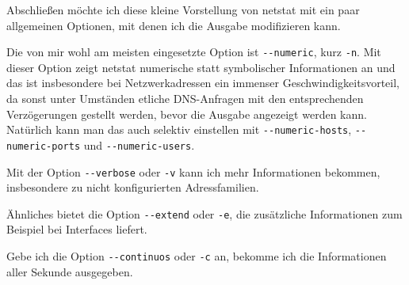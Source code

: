 \begin{normaltext}
  Abschließen möchte ich diese kleine Vorstellung von netstat mit ein paar
  allgemeinen Optionen, mit denen ich die Ausgabe modifizieren kann.

  Die von mir wohl am meisten eingesetzte Option ist \verb?--numeric?, kurz
  \verb?-n?. Mit dieser Option zeigt netstat numerische statt symbolischer
  Informationen an und das ist insbesondere bei Netzwerkadressen ein immenser
  Geschwindigkeitsvorteil, da sonst unter Umständen etliche DNS-Anfragen mit
  den entsprechenden Verzögerungen gestellt werden, bevor die Ausgabe
  angezeigt werden kann. Natürlich kann man das auch selektiv einstellen mit
  \verb?--numeric-hosts?, \verb?--numeric-ports? und \verb?--numeric-users?.

  Mit der Option \verb?--verbose? oder \verb?-v? kann ich mehr Informationen
  bekommen, insbesondere zu nicht konfigurierten Adressfamilien.

  Ähnliches bietet die Option \verb?--extend? oder \verb?-e?, die zusätzliche
  Informationen zum Beispiel bei Interfaces liefert.

  Gebe ich die Option \verb?--continuos? oder \verb?-c? an, bekomme ich die
  Informationen aller Sekunde ausgegeben.
\end{normaltext}


